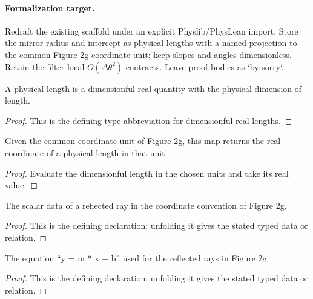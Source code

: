 \paragraph{Formalization target.}
Redraft the existing scaffold under an explicit Physlib/PhysLean import.  Store
the mirror radius and intercept as physical lengths with a named projection to
the common Figure 2g coordinate unit; keep slopes and angles dimensionless.
Retain the filter-local \(O(\Delta\theta^2)\) contracts.  Leave proof bodies as
`by sorry`.

\begin{definition}[PhysicalLength]
  \label{decl:physics:IPhO_2026_2_C_2:PhysicalLength}
  A physical length is a dimensionful real quantity with the physical
  dimension of length.
\end{definition}
\begin{proof}
  This is the defining type abbreviation for dimensionful real lengths.
\end{proof}

\begin{definition}
  \label{decl:physics:IPhO_2026_2_C_2:figure2gLengthReadout}
  Given the common coordinate unit of Figure 2g, this map returns the real
  coordinate of a physical length in that unit.
\end{definition}
\begin{proof}
  Evaluate the dimensionful length in the chosen units and take its real
  value.
\end{proof}

\begin{definition}[ReflectedRayReadout]
  \label{decl:physics:IPhO_2026_2_C_2:ReflectedRayReadout}
  The scalar data of a reflected ray in the coordinate convention of Figure 2g.
\end{definition}
\begin{proof}
  This is the defining declaration; unfolding it gives the stated typed data or relation.
\end{proof}

\begin{definition}
  \label{decl:physics:IPhO_2026_2_C_2:ReflectedRayReadout:yCoordinateLengthReadout}
  The equation “y = m * x + b” used for the reflected rays in Figure 2g.
\end{definition}
\begin{proof}
  This is the defining declaration; unfolding it gives the stated typed data or relation.
\end{proof}

